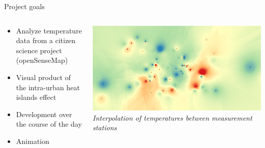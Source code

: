 \begin{frame}{Project goals}
\begin{columns}[T] %
	\begin{column}{.56\textwidth}
		\begin{itemize}
			\item Analyze temperature data from a citizen science project (openSenseMap)
			\item Visual product of the intra-urban heat islands effect
			\item Development over the course of the day
			\item Animation
		\end{itemize}
	\end{column}%
	\hfill%
	\begin{column}{.44\textwidth}
		\includegraphics[width=\linewidth]{../writeup/images/interpolation_idw.png}\\
		\textit{\footnotesize Interpolation of temperatures between measurement stations}
	\end{column}%
\end{columns}
\end{frame}
